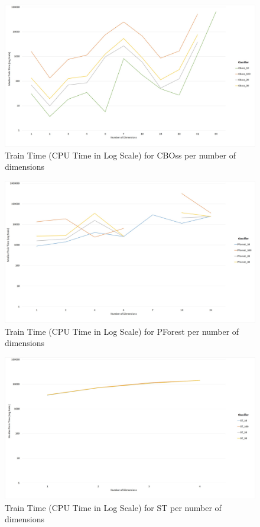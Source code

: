  \begin{figure} [!htb]
    \centering
    \includegraphics[width=\textwidth]{./Chapters/06 Results/Duration_cboss_dim.jpg}
    \caption{Train Time (CPU Time in Log Scale) for CBOss per number of dimensions}
  \end{figure}
  
  \begin{figure} [!htb]
    \centering
    \includegraphics[width=\textwidth]{./Chapters/06 Results/Duration_pforest_dim.jpg}
    \caption{Train Time (CPU Time in Log Scale) for PForest per number of dimensions}
  \end{figure}
  
  \begin{figure} [!htb]
    \centering
    \includegraphics[width=\textwidth]{./Chapters/06 Results/Duration_st_dim.jpg}
    \caption{Train Time (CPU Time in Log Scale) for ST per number of dimensions}
  \end{figure}
  
